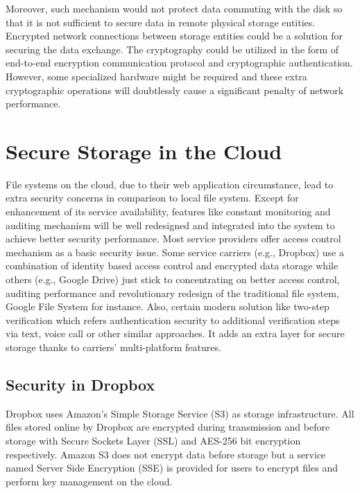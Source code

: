 Moreover, such mechanism would not protect data commuting with the disk so that it is not sufficient to secure data in remote physical storage entities. Encrypted network connections between storage entities could be a solution for securing the data exchange. The cryptography could be utilized in the form of end-to-end encryption communication protocol and cryptographic authentication\cite{Laboratories1993}. However, some specialized hardware might be required and these extra cryptographic operations will doubtlessly cause a significant penalty of network performance.

\section{Secure Storage in the Cloud}

File systems on the cloud, due to their web application circumstance, lead to extra security concerns in comparison to local file system. Except for enhancement of its service availability, features like constant monitoring and auditing mechanism will be well redesigned and integrated into the system to achieve better security performance\cite{Ghemawat2003}. Most service providers offer access control mechanism as a basic security issue. Some service carriers (e.g., Dropbox) use a combination of identity based access control and encrypted data storage while others (e.g., Google Drive) just stick to concentrating on better access control, auditing performance and revolutionary redesign of the traditional file system, Google File System for instance. Also, certain modern solution like two-step verification which refers authentication security to additional verification steps via text, voice call or other similar approaches. It adds an extra layer for secure storage thanks to carriers’ multi-platform features.

\subsection{Security in Dropbox}

Dropbox uses Amazon's Simple Storage Service (S3) as storage infrastructure. All files stored online by Dropbox are encrypted during transmission and before storage with Secure Sockets Layer (SSL) and AES-256 bit encryption respectively\cite{Dropbox2013}. Amazon S3 does not encrypt data before storage but a service named Server Side Encryption (SSE) is provided for users to encrypt files and perform key management on the cloud.

